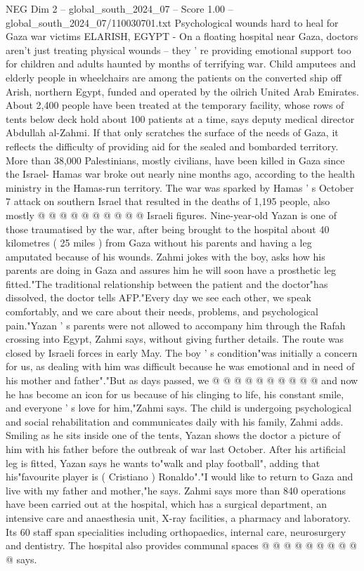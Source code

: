 \begin{textsample}{NEG Dim 2 – global\_south\_2024\_07 – Score 1.00 – global\_south\_2024\_07/110030701.txt}  \label{ex:f2_neg_381}
Psychological wounds hard to heal for Gaza war victims ELARISH, EGYPT - On a floating hospital near Gaza, doctors aren't just treating physical wounds -- they ' re providing emotional support too for children and adults haunted by months of terrifying war.
Child amputees and elderly people in wheelchairs are among the patients on the converted ship off Arish, northern Egypt, funded and operated by the oilrich United Arab Emirates.
About 2,400 people have been treated at the temporary facility, whose rows of tents below deck hold about 100 patients at a time, says deputy medical director Abdullah al-Zahmi.
If that only scratches the surface of the needs of Gaza, it reflects the difficulty of providing aid for the sealed and bombarded territory.
More than 38,000 Palestinians, mostly civilians, have been killed in Gaza since the Israel- Hamas war broke out nearly nine months ago, according to the health ministry in the Hamas-run territory.
The war was sparked by Hamas ' s October 7 attack on southern Israel that resulted in the deaths of 1,195 people, also mostly @ @ @ @ @ @ @ @ @ @ Israeli figures.
Nine-year-old Yazan is one of those traumatised by the war, after being brought to the hospital about 40 kilometres ( 25 miles ) from Gaza without his parents and having a leg amputated because of his wounds.
Zahmi jokes with the boy, asks how his parents are doing in Gaza and assures him he will soon have a prosthetic leg fitted."The traditional relationship between the patient and the doctor"has dissolved, the doctor tells AFP."Every day we see each other, we speak comfortably, and we care about their needs, problems, and psychological pain."Yazan ' s parents were not allowed to accompany him through the Rafah crossing into Egypt, Zahmi says, without giving further details.
The route was closed by Israeli forces in early May.
The boy ' s condition"was initially a concern for us, as dealing with him was difficult because he was emotional and in need of his mother and father"."But as days passed, we @ @ @ @ @ @ @ @ @ @ and now he has become an icon for us because of his clinging to life, his constant smile, and everyone ' s love for him,"Zahmi says.
The child is undergoing psychological and social rehabilitation and communicates daily with his family, Zahmi adds.
Smiling as he sits inside one of the tents, Yazan shows the doctor a picture of him with his father before the outbreak of war last October.
After his artificial leg is fitted, Yazan says he wants to"walk and play football", adding that his"favourite player is ( Cristiano ) Ronaldo"."I would like to return to Gaza and live with my father and mother,"he says.
Zahmi says more than 840 operations have been carried out at the hospital, which has a surgical department, an intensive care and anaesthesia unit, X-ray facilities, a pharmacy and laboratory.
Its 60 staff span specialities including orthopaedics, internal care, neurosurgery and dentistry.
The hospital also provides communal spaces @ @ @ @ @ @ @ @ @ @ says.

\end{textsample}
